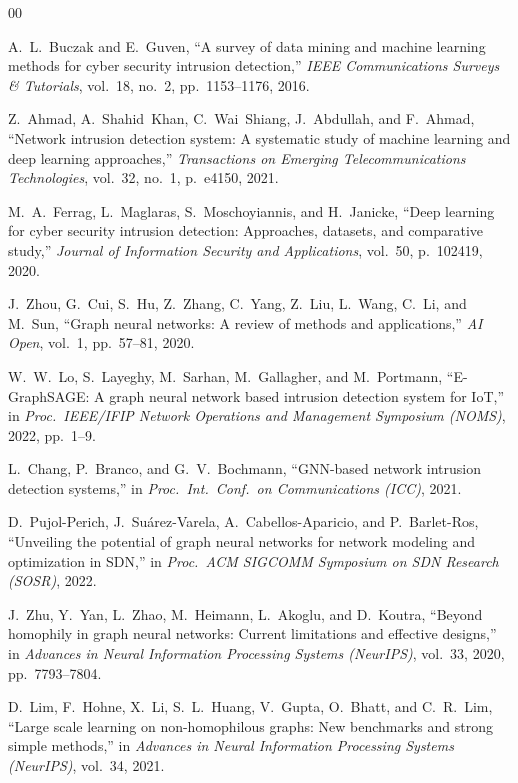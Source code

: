 \documentclass[conference]{IEEEtran}
\begin{document}
\begin{thebibliography}{00}

A.~L.~Buczak and E.~Guven, ``A survey of data mining and machine learning methods for cyber security intrusion detection,'' \textit{IEEE Communications Surveys \& Tutorials}, vol.~18, no.~2, pp.~1153--1176, 2016.

Z.~Ahmad, A.~Shahid~Khan, C.~Wai~Shiang, J.~Abdullah, and F.~Ahmad, ``Network intrusion detection system: A systematic study of machine learning and deep learning approaches,'' \textit{Transactions on Emerging Telecommunications Technologies}, vol.~32, no.~1, p.~e4150, 2021.

M.~A.~Ferrag, L.~Maglaras, S.~Moschoyiannis, and H.~Janicke, ``Deep learning for cyber security intrusion detection: Approaches, datasets, and comparative study,'' \textit{Journal of Information Security and Applications}, vol.~50, p.~102419, 2020.

J.~Zhou, G.~Cui, S.~Hu, Z.~Zhang, C.~Yang, Z.~Liu, L.~Wang, C.~Li, and M.~Sun, ``Graph neural networks: A review of methods and applications,'' \textit{AI Open}, vol.~1, pp.~57--81, 2020.

W.~W.~Lo, S.~Layeghy, M.~Sarhan, M.~Gallagher, and M.~Portmann, ``E-GraphSAGE: A graph neural network based intrusion detection system for IoT,'' in \textit{Proc.\ IEEE/IFIP Network Operations and Management Symposium (NOMS)}, 2022, pp.~1--9.

L.~Chang, P.~Branco, and G.~V.~Bochmann, ``GNN-based network intrusion detection systems,'' in \textit{Proc.\ Int.\ Conf.\ on Communications (ICC)}, 2021.

D.~Pujol-Perich, J.~Su\'{a}rez-Varela, A.~Cabellos-Aparicio, and P.~Barlet-Ros, ``Unveiling the potential of graph neural networks for network modeling and optimization in SDN,'' in \textit{Proc.\ ACM SIGCOMM Symposium on SDN Research (SOSR)}, 2022.

J.~Zhu, Y.~Yan, L.~Zhao, M.~Heimann, L.~Akoglu, and D.~Koutra, ``Beyond homophily in graph neural networks: Current limitations and effective designs,'' in \textit{Advances in Neural Information Processing Systems (NeurIPS)}, vol.~33, 2020, pp.~7793--7804.

D.~Lim, F.~Hohne, X.~Li, S.~L.~Huang, V.~Gupta, O.~Bhatt, and C.~R.~Lim, ``Large scale learning on non-homophilous graphs: New benchmarks and strong simple methods,'' in \textit{Advances in Neural Information Processing Systems (NeurIPS)}, vol.~34, 2021.


\end{thebibliography}
\end{document}
